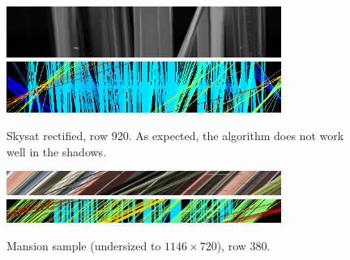 \documentclass{article}
\def\epiWidth{0.8}
\theoremstyle{definition}
\begin{document}
\begin{figure}[ht]
  \centering
  \includegraphics[width=\epiWidth\textwidth]{images/1520205074004_epi.png}\\
  \includegraphics[width=\epiWidth\textwidth]{images/1520205074004_epi_colored.png}
  \caption{Skysat rectified, row 920. As expected, the algorithm does not work well in the shadows.}
\end{figure}


\begin{figure}[ht]
  \centering
  \includegraphics[width=\epiWidth\textwidth]{images/1520202945623_epi.png}\\
  \includegraphics[width=\epiWidth\textwidth]{images/1520202945623_epi_colored.png}
  \caption{Mansion sample (undersized to $1146\times 720$), row 380.}
\end{figure}


\clearpage


\end{document}
